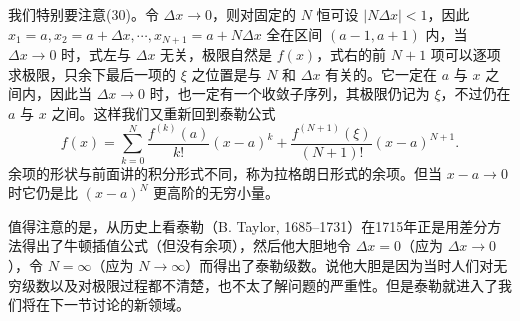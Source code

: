 我们特别要注意(30)。令 $\Delta x\to0$，则对固定的 $N$ 恒可设 $|N\Delta x|<1$，因此 $x_1=a,x_2=a+\Delta x,\cdots,x_{N+1}=a+N\Delta x$ 全在区间 $(a-1,a+1)$ 内，当 $\Delta x\to0$ 时，式左与 $\Delta x$ 无关，极限自然是 $f(x)$，式右的前 $N+1$ 项可以逐项求极限，只余下最后一项的 $\xi$ 之位置是与 $N$ 和 $\Delta x$ 有关的。它一定在 $a$ 与 $x$ 之间内，因此当 $\Delta x\to0$ 时，也一定有一个收敛子序列，其极限仍记为 $\xi$，不过仍在 $a$ 与 $x$ 之间。这样我们又重新回到泰勒公式
\begin{equation}
 f(x)=\sum_{k=0}^N\frac{f^{(k)}(a)}{k!}(x-a)^k
 +\frac{f^{(N+1)}(\xi)}{(N+1)!}(x-a)^{N+1}.
 \tag{31}
\end{equation}
余项的形状与前面讲的积分形式不同，称为拉格朗日形式的余项。但当 $x-a\to0$ 时它仍是比 $(x-a)^N$ 更高阶的无穷小量。

值得注意的是，从历史上看泰勒（B. Taylor, 1685--1731）在1715年正是用差分方法得出了牛顿插值公式（但没有余项），然后他大胆地令 $\Delta x=0$（应为 $\Delta x\to0$），令 $N=\infty$（应为 $N\to\infty$）而得出了泰勒级数。说他大胆是因为当时人们对无穷级数以及对极限过程都不清楚，也不太了解问题的严重性。但是泰勒就进入了我们将在下一节讨论的新领域。
